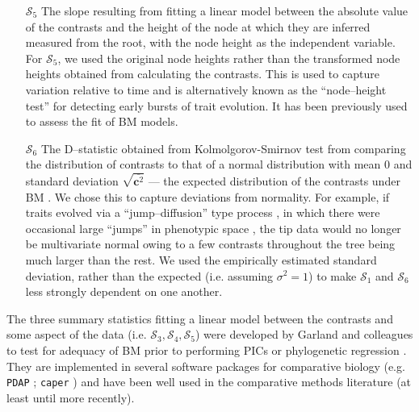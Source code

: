 \documentclass[a4paper,12pt]{article}
\begin{document}
\begin{enumerate}
\item[$\mathcal{S}_5$] The slope resulting from fitting a linear model between the absolute value of the contrasts and the height of the node at which they are inferred measured from the root, with the node height as the independent variable. For $\mathcal{S}_5$, we used the original node heights rather than the transformed node heights obtained from calculating the contrasts. This is used to capture variation relative to time and is alternatively known as the ``node--height test'' \citep{FreckletonHarvey2006, SlaterPennell} for detecting early bursts of trait evolution. It has been  previously used to assess the fit of BM models.

\item[$\mathcal{S}_6$] The D--statistic obtained from Kolmolgorov-Smirnov test from comparing the distribution of contrasts to that of a normal distribution with mean 0 and standard deviation $\sqrt{\overline{\mathbf{c}^2}}$ --- the expected distribution of the contrasts under BM \citep{Felsenstein1985, Rohlf2001}. We chose this to capture deviations from normality. For example, if traits evolved via a ``jump--diffusion'' type process \citep{Landis2012, Eastmanlevy}, in which there were occasional large ``jumps'' in phenotypic space \citep[see][]{PennellPE}, the tip data would no longer be multivariate normal owing to a few contrasts throughout the tree being much larger than the rest.  We used the empirically estimated standard deviation, rather than the expected (i.e. assuming $\sigma^2=1$) to make $\mathcal{S}_1$ and $\mathcal{S}_6$ less strongly dependent on one another.

\end{enumerate}

The three summary statistics fitting a linear model between the contrasts and some aspect of the data (i.e. $\mathcal{S}_3, \mathcal{S}_4, \mathcal{S}_5$) were developed by Garland and colleagues \citep{Garland1992, Garland1993,  Diaz1996} to test for adequacy of BM prior to performing PICs \citep{Felsenstein1985} or phylogenetic regression \citep{Grafen1989}. They are implemented in several software packages for comparative biology (e.g. \texttt{PDAP} \citealt{Midford2005}; \texttt{caper} \citealt{caper}) and have been well used in the comparative methods literature (at least until more recently).
\end{document}
